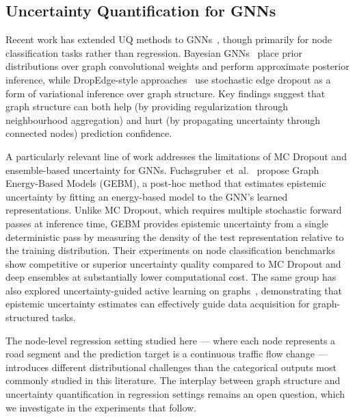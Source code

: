 \subsection{Uncertainty Quantification for GNNs}

Recent work has extended UQ methods to GNNs~\cite{zhang2019bayesian, hasanzadeh2020bayesian}, though primarily for node classification tasks rather than regression. Bayesian GNNs~\cite{zhang2019bayesian} place prior distributions over graph convolutional weights and perform approximate posterior inference, while DropEdge-style approaches~\cite{hasanzadeh2020bayesian} use stochastic edge dropout as a form of variational inference over graph structure. Key findings suggest that graph structure can both help (by providing regularization through neighbourhood aggregation) and hurt (by propagating uncertainty through connected nodes) prediction confidence.

A particularly relevant line of work addresses the limitations of MC Dropout and ensemble-based uncertainty for GNNs. Fuchsgruber~et~al.~\cite{fuchsgruber2024energy} propose Graph Energy-Based Models (GEBM), a post-hoc method that estimates epistemic uncertainty by fitting an energy-based model to the GNN's learned representations. Unlike MC Dropout, which requires multiple stochastic forward passes at inference time, GEBM provides epistemic uncertainty from a single deterministic pass by measuring the density of the test representation relative to the training distribution. Their experiments on node classification benchmarks show competitive or superior uncertainty quality compared to MC Dropout and deep ensembles at substantially lower computational cost. The same group has also explored uncertainty-guided active learning on graphs~\cite{fuchsgruber2024uncertainty}, demonstrating that epistemic uncertainty estimates can effectively guide data acquisition for graph-structured tasks.

The node-level regression setting studied here --- where each node represents a road segment and the prediction target is a continuous traffic flow change --- introduces different distributional challenges than the categorical outputs most commonly studied in this literature. The interplay between graph structure and uncertainty quantification in regression settings remains an open question, which we investigate in the experiments that follow.
